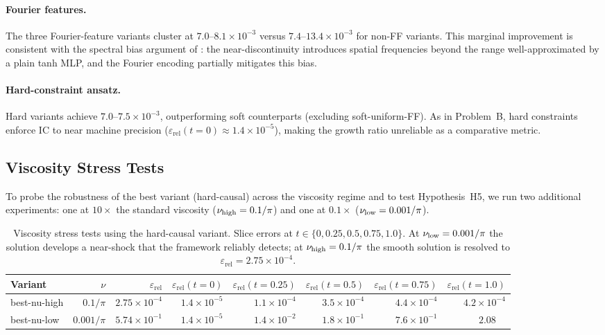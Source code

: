 \documentclass{article}
\newcommand{\relL}{\varepsilon_{\mathrm{rel}}}
\begin{document}
\paragraph{Fourier features.}
The three Fourier-feature variants cluster at $7.0\text{--}8.1\times10^{-3}$
versus $7.4\text{--}13.4\times10^{-3}$ for non-FF variants.
This marginal improvement is consistent with the spectral bias argument of
\citet{tancik2020ff}: the near-discontinuity introduces spatial frequencies
beyond the range well-approximated by a plain tanh MLP, and the Fourier
encoding partially mitigates this bias.

\paragraph{Hard-constraint ansatz.}
Hard variants achieve $7.0\text{--}7.5\times10^{-3}$, outperforming soft
counterparts (excluding soft-uniform-FF).
As in Problem~B, hard constraints enforce IC to near machine precision
($\relL(t{=}0) \approx 1.4\times10^{-5}$), making the growth ratio unreliable
as a comparative metric.

\subsection{Viscosity Stress Tests}
\label{sec:burgers_viscosity}

To probe the robustness of the best variant (hard-causal) across the viscosity
regime and to test Hypothesis~H5, we run two additional experiments: one at
$10\times$ the standard viscosity ($\nu_{\rm high}=0.1/\pi$) and one at
$0.1\times$ ($\nu_{\rm low}=0.001/\pi$).

\begin{table}[h]
\centering
\caption{Viscosity stress tests using the hard-causal variant.
Slice errors at $t\in\{0, 0.25, 0.5, 0.75, 1.0\}$.
At $\nu_{\rm low}=0.001/\pi$ the solution develops a near-shock that
the framework reliably detects; at $\nu_{\rm high}=0.1/\pi$ the smooth
solution is resolved to $\relL=2.75\times10^{-4}$.}
\label{tab:burgers_viscosity}
\small
\begin{tabular}{lrrrrrrr}
\toprule
Variant & $\nu$ & $\relL$ & $\relL(t{=}0)$ & $\relL(t{=}0.25)$
        & $\relL(t{=}0.5)$ & $\relL(t{=}0.75)$ & $\relL(t{=}1.0)$ \\
\midrule
best-nu-high & $0.1/\pi$   & $2.75\times10^{-4}$
  & $1.4\times10^{-5}$ & $1.1\times10^{-4}$ & $3.5\times10^{-4}$
  & $4.4\times10^{-4}$ & $4.2\times10^{-4}$ \\
\rowcolor{pink!40}
best-nu-low  & $0.001/\pi$ & $5.74\times10^{-1}$
  & $1.4\times10^{-5}$ & $1.4\times10^{-2}$ & $1.8\times10^{-1}$
  & $7.6\times10^{-1}$ & $2.08\phantom{00}$ \\
\bottomrule
\end{tabular}
\end{table}
\end{document}
